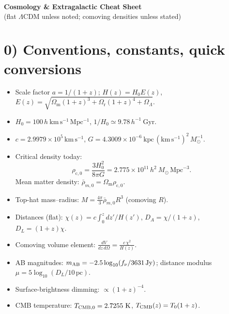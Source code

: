 \documentclass[11pt,a4paper]{article}
\newcommand{\Hnot}{H_0}
\newcommand{\hubble}{h}
\newcommand{\Omm}{\Omega_{\mathrm m}}
\newcommand{\Omr}{\Omega_{\mathrm r}}
\newcommand{\Oml}{\Omega_{\Lambda}}
\begin{document}
\begin{center}
{\Large \textbf{Cosmology \& Extragalactic Cheat Sheet}}\\
\small (flat $\Lambda$CDM unless noted; comoving densities unless stated)
\end{center}

\section*{0) Conventions, constants, quick conversions}
\begin{itemize}
\item Scale factor $a=1/(1+z)$; \; $H(z)=\Hnot E(z)$, \;
$E(z)=\sqrt{\Omm(1+z)^3+\Omr(1+z)^4+\Oml}$.
\item $\Hnot=100\,\hubble\ \mathrm{km\,s^{-1}\,Mpc^{-1}}$, \quad $1/\Hnot\simeq 9.78\,\hubble^{-1}\ \mathrm{Gyr}$.
\item $c=2.9979\times10^5\,\mathrm{km\,s^{-1}}$, \;
$G=4.3009\times10^{-6}\ \mathrm{kpc}\,(\mathrm{km\,s^{-1}})^2\,M_\odot^{-1}$.
\item Critical density today:
\[
\rho_{\mathrm c,0}=\frac{3\Hnot^2}{8\pi G}
=2.775\times10^{11}\,\hubble^2\ M_\odot\,\mathrm{Mpc}^{-3}.
\]
Mean matter density: $\bar\rho_{m,0}=\Omm\rho_{\mathrm c,0}$.
\item Top-hat mass--radius: $M=\frac{4\pi}{3}\bar\rho_{m,0}R^3$ (comoving $R$).
\item Distances (flat): $\chi(z)=c\int_0^z\!dz'/H(z')$,\; $D_A=\chi/(1+z)$,\; $D_L=(1+z)\chi$.
\item Comoving volume element: $\displaystyle \frac{dV}{dz\,d\Omega}=\frac{c\,\chi^2}{H(z)}$.
\item AB magnitudes: $m_{\rm AB}=-2.5\log_{10}(f_\nu/3631\,\mathrm{Jy})$;\; distance modulus $\mu=5\log_{10}(D_L/10\,\mathrm{pc})$.
\item Surface-brightness dimming: $\propto (1+z)^{-4}$.
\item CMB temperature: $T_{\rm CMB,0}=2.7255\ {\rm K}$,\; $T_{\rm CMB}(z)=T_0(1+z)$.
\end{itemize}

\end{document}
